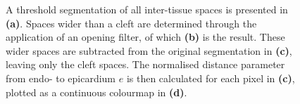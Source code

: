     \begin{figure}[htbp]
      \centering
      \caption{A threshold segmentation of all inter-tissue spaces is presented in \textbf{(a)}. Spaces wider than a cleft are determined through the application of an opening filter, of which \textbf{(b)} is the result. These wider spaces are subtracted from the original segmentation in \textbf{(c)}, leaving only the cleft spaces. The normalised distance parameter from endo- to epicardium $e$ is then calculated for each pixel in \textbf{(c)}, plotted as a continuous colourmap in \textbf{(d)}.}
      \label{fig:2D_cleft_extraction}
    \end{figure}
  
